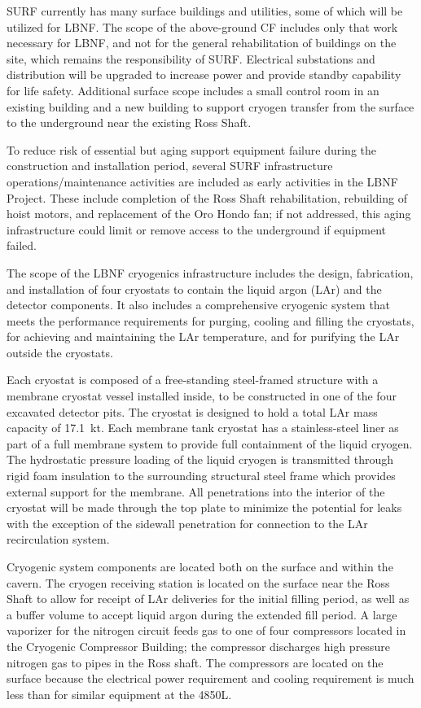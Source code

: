 SURF currently has many surface buildings and utilities, some of which will be utilized for LBNF. The scope of the above-ground CF includes only that work necessary for LBNF, and not for the general rehabilitation of buildings on the site, which remains the responsibility of SURF. 
Electrical substations and distribution will be upgraded to increase power and provide standby capability for life safety. Additional surface scope includes a small control room in an existing building and a new building to support cryogen transfer from the surface to the underground near the existing Ross Shaft.
 
To reduce risk of essential but aging support equipment failure during the construction and installation period, several SURF infrastructure operations/maintenance activities are included as early activities in  the LBNF Project. These include completion of the Ross Shaft rehabilitation, rebuilding of hoist motors, and replacement of the Oro Hondo fan; if not addressed, this aging infrastructure could limit or remove access to the underground if equipment failed. 
 
The scope of the LBNF cryogenics infrastructure includes the design, fabrication, and installation of four cryostats to contain the liquid argon (LAr) and the detector components. It also includes a comprehensive cryogenic system that meets the performance requirements for purging, cooling and filling the cryostats, for achieving and maintaining the LAr temperature, and for purifying the LAr outside the cryostats. 
 
Each cryostat is composed of a free-standing steel-framed structure with a membrane cryostat vessel installed inside, to be constructed in one of the four excavated detector pits. The cryostat is designed to hold a total LAr mass capacity of 
17.1~kt. Each membrane tank cryostat has a stainless-steel liner as part of a full membrane system to provide full containment of the liquid cryogen. The hydrostatic pressure loading of the liquid cryogen is transmitted through rigid foam insulation to the surrounding structural steel frame which provides external support for the membrane. All penetrations into the interior of the cryostat will be made through the top plate to minimize the potential for leaks with the exception of the sidewall penetration for connection to the LAr recirculation system.
 
Cryogenic system components are located both on the surface and within the cavern. The cryogen receiving station is located on the surface near the Ross Shaft to allow for receipt of LAr deliveries for the initial filling period, as well as a buffer volume to accept liquid argon during the extended fill period. A large vaporizer for the nitrogen circuit feeds gas to one of four compressors located in the Cryogenic Compressor Building; the compressor discharges high pressure nitrogen gas to pipes in the Ross shaft. The compressors are located on the surface because the electrical power requirement and cooling requirement is much less than for similar equipment at the 4850L.  
 
